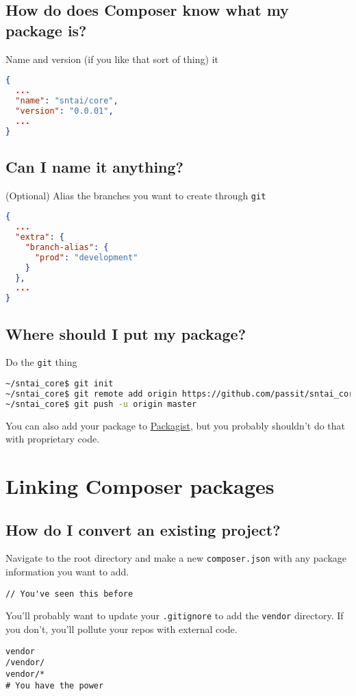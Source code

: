 \documentclass[pdf]{beamer}
\newcommand{\com}[1]{\lstinline$#1$}
\begin{document}
\subsection{How do does Composer know what my package is?}
\begin{frame}[fragile]
Name and version (if you like that sort of thing) it
\begin{lstlisting}[language=json]
{
  ...
  "name": "sntai/core",
  "version": "0.0.01",
  ...
}
\end{lstlisting}
\end{frame}
\subsection{Can I name it anything?}
\begin{frame}[fragile]
(Optional) Alias the branches you want to create through \com{git}
\begin{lstlisting}[language=json]
{
  ...
  "extra": {
    "branch-alias": {
      "prod": "development"
    }
  },
  ...
}
\end{lstlisting}
\end{frame}
\subsection{Where should I put my package?}
\begin{frame}[fragile]
Do the \com{git} thing
\begin{lstlisting}[language=bash]
~/sntai_core$ git init
~/sntai_core$ git remote add origin https://github.com/passit/sntai_core.git
~/sntai_core$ git push -u origin master
\end{lstlisting}
You can also add your package to \href{https://packagist.org/}{Packagist}, but you probably shouldn't do that with proprietary code.
\end{frame}

\section{Linking Composer packages}
\subsection{How do I convert an existing project?}
\begin{frame}[fragile]
Navigate to the root directory and make a new \com{composer.json} with any package information you want to add.
\begin{lstlisting}
// You've seen this before
\end{lstlisting}
\end{frame}
\begin{frame}[fragile]
You'll probably want to update your \com{.gitignore} to add the \com{vendor} directory. If you don't, you'll pollute your repos with external code.
\begin{lstlisting}
vendor
/vendor/
vendor/*
# You have the power
\end{lstlisting}
\end{frame}
\end{document}
